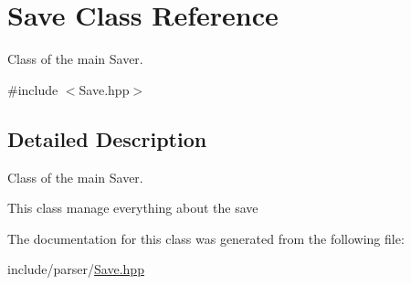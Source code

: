 \hypertarget{classSave}{}\section{Save Class Reference}
\label{classSave}


Class of the main Saver.  




{\ttfamily \#include $<$Save.\+hpp$>$}



\subsection{Detailed Description}
Class of the main Saver. 

This class manage everything about the save 

The documentation for this class was generated from the following file\+:\begin{DoxyCompactItemize}
\item 
include/parser/\hyperlink{Save_8hpp}{Save.\+hpp}\end{DoxyCompactItemize}
